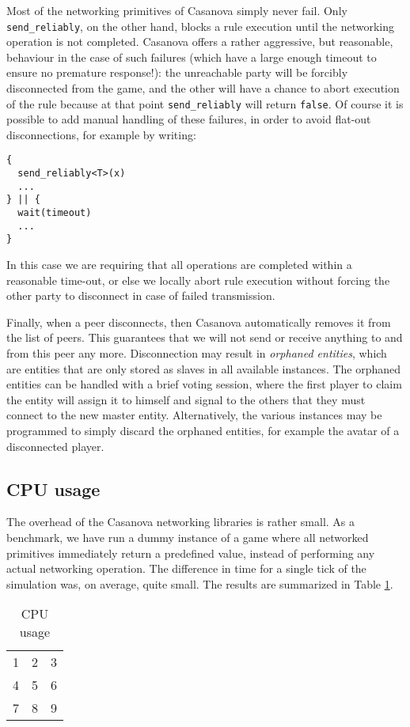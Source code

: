 Most of the networking primitives of Casanova simply never fail. Only \texttt{send\_reliably}, on the other hand, blocks a rule execution until the networking operation is not completed. Casanova offers a rather aggressive, but reasonable, behaviour in the case of such failures (which have a large enough timeout to ensure no premature response!): the unreachable party will be forcibly disconnected from the game, and the other will have a chance to abort execution of the rule because at that point \texttt{send\_reliably} will return \texttt{false}. Of course it is possible to add manual handling of these failures, in order to avoid flat-out disconnections, for example by writing:

\begin{lstlisting}
{
  send_reliably<T>(x)
  ...
} || { 
  wait(timeout)
  ...
}
\end{lstlisting}

In this case we are requiring that all operations are completed within a reasonable time-out, or else we locally abort rule execution without forcing the other party to disconnect in case of failed transmission.

Finally, when a peer disconnects, then Casanova automatically removes it from the list of peers. This guarantees that we will not send or receive anything to and from this peer any more. Disconnection may result in \textit{orphaned entities}, which are entities that are only stored as slaves in all available instances. The orphaned entities can be handled with a brief voting session, where the first player to claim the entity will assign it to himself and signal to the others that they must connect to the new master entity. Alternatively, the various instances may be programmed to simply discard the orphaned entities, for example the avatar of a disconnected player.

\subsection{CPU usage}
The overhead of the Casanova networking libraries is rather small. As a benchmark, we have run a dummy instance of a game where all networked primitives immediately return a predefined value, instead of performing any actual networking operation. The difference in time for a single tick of the simulation was, on average, quite small. The results are summarized in Table \ref{tab:cpu usage}.

\begin{table}
\center
\begin{tabular}{ l c r }
  1 & 2 & 3 \\
  4 & 5 & 6 \\
  7 & 8 & 9 \\
\end{tabular}
\label{tab:cpu usage}
\caption{CPU usage}
\end{table}

